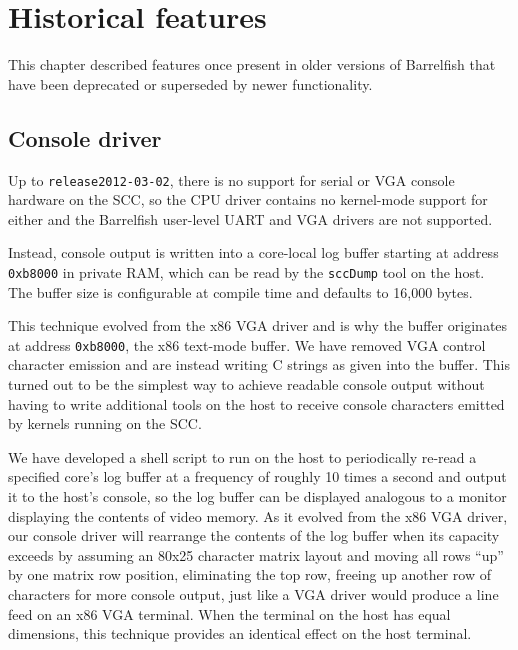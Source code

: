 \documentclass[a4paper,twoside]{report} %
\begin{document}
\chapter{Historical features}\label{chap:historical}

This chapter described features once present in older versions of
Barrelfish that have been deprecated or superseded by newer
functionality.

\section{Console driver}

Up to \verb+release2012-03-02+, there is no support for serial or VGA
console hardware on the SCC, so the CPU driver contains no kernel-mode
support for either and the Barrelfish user-level UART and VGA drivers
are not supported.

Instead, console output is written into a core-local log buffer
starting at address \texttt{0xb8000} in private RAM, which can be read
by the \texttt{sccDump} tool on the host. The buffer size is
configurable at compile time and defaults to 16,000 bytes.

This technique evolved from the x86 VGA driver and is why the buffer
originates at address \texttt{0xb8000}, the x86 text-mode buffer. We
have removed VGA control character emission and are instead writing C
strings as given into the buffer. This turned out to be the simplest
way to achieve readable console output without having to write
additional tools on the host to receive console characters emitted by
kernels running on the SCC.

We have developed a shell script to run on the host to periodically
re-read a specified core's log buffer at a frequency of roughly 10
times a second and output it to the host's console, so the log buffer
can be displayed analogous to a monitor displaying the contents of
video memory. As it evolved from the x86 VGA driver, our console
driver will rearrange the contents of the log buffer when its capacity
exceeds by assuming an 80x25 character matrix layout and moving all
rows ``up'' by one matrix row position, eliminating the top row,
freeing up another row of characters for more console output, just
like a VGA driver would produce a line feed on an x86 VGA
terminal. When the terminal on the host has equal dimensions, this
technique provides an identical effect on the host terminal.
\end{document}
